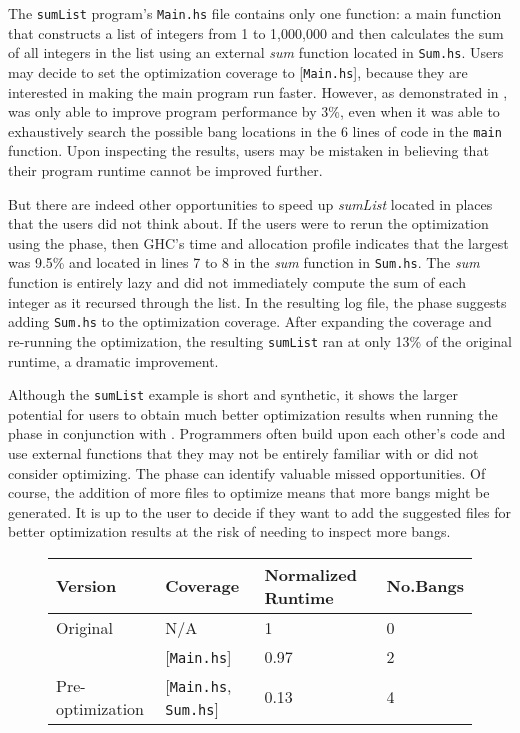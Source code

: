 The \texttt{sumList} program's \texttt{Main.hs} file contains only one
function: a main function that constructs a list of integers from 1 to
1,000,000 and then calculates the sum of all integers in the list using an
external \textit{sum} function located in \texttt{Sum.hs}. Users
may decide to set the optimization coverage to [\texttt{Main.hs}],
because they are interested in making the main program run
faster. However, as demonstrated in , \Ao{} was only able to
improve program performance by 3\%, even when it was able to
exhaustively search the possible bang locations in the 6 lines of code in the \texttt{main}
function. Upon inspecting the results, users may be mistaken in
believing that their program runtime cannot be improved
further.

But there are indeed other opportunities to speed up \textit{sumList}
located in places that the users did not think about. If the users were
to rerun the optimization using the \preopt{} phase, then GHC's time and
allocation profile indicates that the largest \hotspotcost{} was 9.5\%
and located in lines 7 to 8 in the \textit{sum} function
in \texttt{Sum.hs}. The \textit{sum} function is entirely lazy and did
not immediately compute the sum of each integer as it recursed through
the list. In the resulting log file, the \preopt{} phase
suggests
adding \texttt{Sum.hs} to the optimization coverage.
After expanding the coverage and re-running the optimization,
the resulting \texttt{sumList} ran at only 13\% of the original
runtime, a dramatic improvement.

Although the \texttt{sumList} example is short and synthetic, it shows
the larger potential for users to obtain much better optimization
results when running the \preopt{} phase in conjunction
with \Ao{}. Programmers often build upon each other's code and use
external functions that they may not be entirely familiar with or did
not consider optimizing. The \preopt{} phase can identify valuable
missed opportunities. Of
course, the addition of more files to optimize means that more bangs
might be generated. It is up to the user to decide if they want to add
the suggested files for better optimization results at the risk of
needing to inspect more bangs.
\newline

\begin{figure}
\centering
\begin{tabular}{p{3cm}p{3.5cm}p{4cm}p{1.5cm}}
\hline
Version   & Coverage & Normalized Runtime & No.Bangs \\
\hline
Original      & N/A   &   1  & 0   \\
\Ao{}       & [\texttt{Main.hs}]      & 0.97    &  2\\
Pre-optimization    & [\texttt{Main.hs}, \texttt{Sum.hs}]         & 0.13      & 4\\
\hline
\end{tabular}
\label{fig:sumList}
\end{figure}

